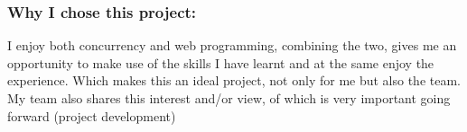 \subsubsection{Why I chose this project:}
\par{I enjoy both concurrency and web programming, combining the two, gives me an opportunity to make use of the skills I have learnt and at the same enjoy the experience. Which makes this an ideal project, not only for me but also the team. My team also shares this interest and/or view, of which is very important going forward (project development)
}
\newpage